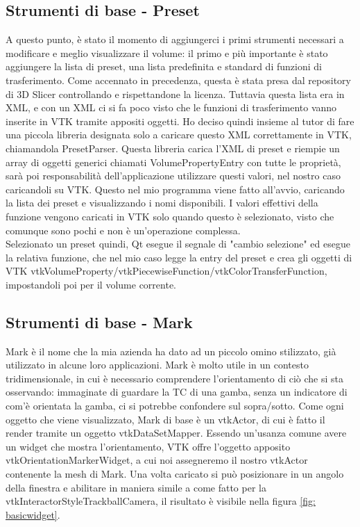 \subsection{Strumenti di base - Preset}
A questo punto, è stato il momento di aggiungerci i primi strumenti necessari a modificare e meglio visualizzare il volume: il primo e più importante è stato aggiungere la lista di preset, una lista predefinita e standard di funzioni di trasferimento. Come accennato in precedenza, questa è stata presa dal repository di 3D Slicer controllando e rispettandone la licenza. Tuttavia questa lista era in XML, e con un XML ci si fa poco visto che le funzioni di trasferimento vanno inserite in VTK tramite appositi oggetti. Ho deciso quindi insieme al tutor di fare una piccola libreria designata solo a caricare questo XML correttamente in VTK, chiamandola PresetParser. Questa libreria carica l'XML di preset e riempie un array di oggetti generici chiamati VolumePropertyEntry con tutte le proprietà, sarà poi responsabilità dell'applicazione utilizzare questi valori, nel nostro caso caricandoli su VTK. Questo nel mio programma viene fatto all'avvio, caricando la lista dei preset e visualizzando i nomi disponibili. I valori effettivi della funzione vengono caricati in VTK solo quando questo è selezionato, visto che comunque sono pochi e non è un'operazione complessa.
\\
Selezionato un preset quindi, Qt esegue il segnale di "cambio selezione" ed esegue la relativa funzione, che nel mio caso legge la entry del preset e crea gli oggetti di VTK vtkVolumeProperty/vtkPiecewiseFunction/vtkColorTransferFunction, impostandoli poi per il volume corrente.

\subsection{Strumenti di base - Mark}
Mark è il nome che la mia azienda ha dato ad un piccolo omino stilizzato, già utilizzato in alcune loro applicazioni. Mark è molto utile in un contesto tridimensionale, in cui è necessario comprendere l'orientamento di ciò che si sta osservando: immaginate di guardare la TC di una gamba, senza un indicatore di com'è orientata la gamba, ci si potrebbe confondere sul sopra/sotto. Come ogni oggetto che viene visualizzato, Mark di base è un vtkActor, di cui è fatto il render tramite un oggetto vtkDataSetMapper. Essendo un'usanza comune avere un widget che mostra l'orientamento, VTK offre l'oggetto apposito vtkOrientationMarkerWidget, a cui noi assegneremo il nostro vtkActor contenente la mesh di Mark. Una volta caricato si può posizionare in un angolo della finestra e abilitare in maniera simile a come fatto per la vtkInteractorStyleTrackballCamera, il risultato è visibile nella figura \ref{fig: basicwidget}.

